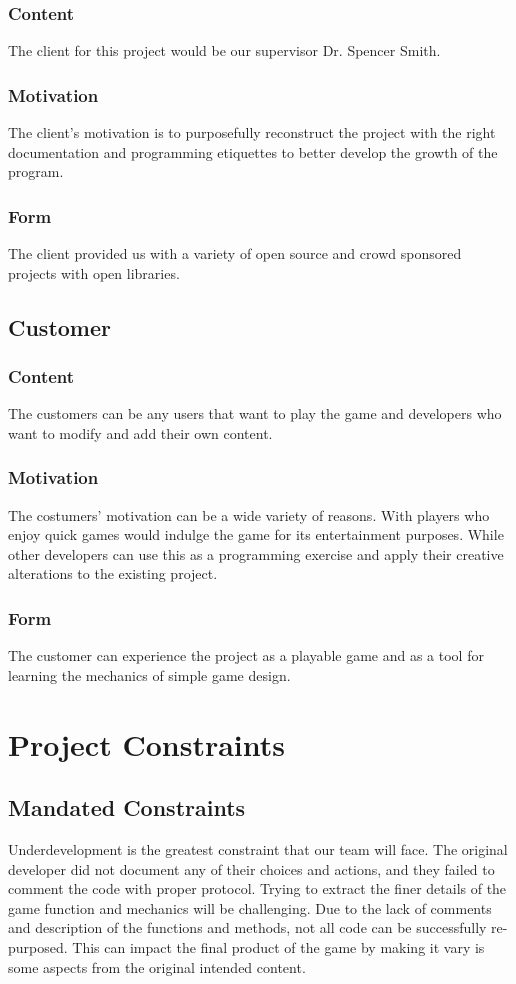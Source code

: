 \documentclass[12pt]{article}
\begin{document}
\subsubsection{Content}
 The client for this project would be our supervisor Dr. Spencer Smith.
\subsubsection{Motivation}
 The client’s motivation is to purposefully reconstruct the project with the right documentation and programming etiquettes to better develop the growth of the program.
\subsubsection{Form}
 The client provided us with a variety of open source and crowd sponsored projects with open libraries.
\subsection{Customer}
\subsubsection{Content}
 The customers can be any users that want to play the game and developers who want to modify and add their own content.
\subsubsection{Motivation}
 The costumers’ motivation can be a wide variety of reasons. With players who enjoy quick games would indulge the game for its entertainment purposes. While other developers can use this as a programming exercise and apply their creative alterations to the existing project.
\subsubsection{Form}
 The customer can experience the project as a playable game and as a tool for learning the mechanics of simple game design.

\section{Project Constraints}
\subsection{Mandated Constraints}
Underdevelopment is the greatest constraint that our team will face. The original developer did not document any of their choices and actions, and they failed to comment the code with proper protocol. Trying to extract the finer details of the game function and mechanics will be challenging. Due to the lack of comments and description of the functions and methods, not all code can be successfully re-purposed. This can impact the final product of the game by making it vary is some aspects from the original intended content.
\end{document}
